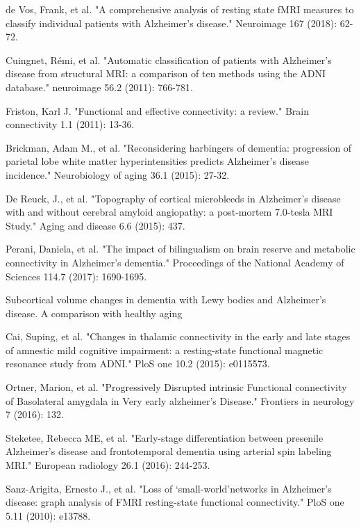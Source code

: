 \documentclass[journal]{IEEEtran}
\begin{document}
\begin{thebibliography}{1}
		de Vos, Frank, et al. "A comprehensive analysis of resting state fMRI measures to classify individual patients with Alzheimer's disease." Neuroimage 167 (2018): 62-72.
		
		Cuingnet, Rémi, et al. "Automatic classification of patients with Alzheimer's disease from structural MRI: a comparison of ten methods using the ADNI database." neuroimage 56.2 (2011): 766-781.
		
		Friston, Karl J. "Functional and effective connectivity: a review." Brain connectivity 1.1 (2011): 13-36.
		
		
		Brickman, Adam M., et al. "Reconsidering harbingers of dementia: progression of parietal lobe white matter hyperintensities predicts Alzheimer's disease incidence." Neurobiology of aging 36.1 (2015): 27-32.
		
		De Reuck, J., et al. "Topography of cortical microbleeds in Alzheimer’s disease with and without cerebral amyloid angiopathy: a post-mortem 7.0-tesla MRI Study." Aging and disease 6.6 (2015): 437.
		
		Perani, Daniela, et al. "The impact of bilingualism on brain reserve and metabolic connectivity in Alzheimer's dementia." Proceedings of the National Academy of Sciences 114.7 (2017): 1690-1695.
		
		Subcortical volume changes in dementia with Lewy bodies and Alzheimer's disease. A comparison with healthy aging
		
		Cai, Suping, et al. "Changes in thalamic connectivity in the early and late stages of amnestic mild cognitive impairment: a resting-state functional magnetic resonance study from ADNI." PloS one 10.2 (2015): e0115573.
		
		Ortner, Marion, et al. "Progressively Disrupted intrinsic Functional connectivity of Basolateral amygdala in Very early alzheimer’s Disease." Frontiers in neurology 7 (2016): 132.
		
		Steketee, Rebecca ME, et al. "Early-stage differentiation between presenile Alzheimer’s disease and frontotemporal dementia using arterial spin labeling MRI." European radiology 26.1 (2016): 244-253.
		
		Sanz-Arigita, Ernesto J., et al. "Loss of ‘small-world’networks in Alzheimer's disease: graph analysis of FMRI resting-state functional connectivity." PloS one 5.11 (2010): e13788.
		

\end{thebibliography}
\end{document}
